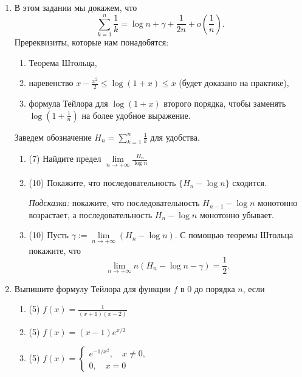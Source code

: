 \documentclass[a4paper]{article}
\begin{document}
\renewcommand{\labelenumii}{\arabic{enumii})}
\renewcommand{\labelenumiii}{\roman{enumiii})}




\begin{enumerate}
    
    \item В этом задании мы докажем, что 
    \[
        \sum\limits_{k = 1}^n \frac{1}{k} = \log n + \gamma + \frac{1}{2n} + o\left( \frac{1}{n} \right).
    \]
    Пререквизиты, которые нам понадобятся:
    \begin{enumerate}[label=(\arabic*)]
        \item Теорема Штольца,
        \item наревенство $x-\frac{x^2}{2}\leq \log (1+x)\leq x$ (будет доказано на практике),
        \item формула Тейлора для $\log(1+x)$ второго порядка, чтобы заменять $\log\left(1 + \frac{1}{n}\right)$ на более удобное выражение.
    \end{enumerate}
    Заведем обозначение $H_n = \sum\limits_{k = 1}^n \frac{1}{k}$ для удобства.
    \begin{enumerate}
        \item (7) Найдите предел $\lim\limits_{n\to +\infty}\frac{H_n}{\log n}$
        \item (10) Покажите, что последовательность $\{H_n - \log n\}$ сходится.
        
        \noindent\emph{Подсказка:} покажите, что последовательность $H_{n-1} - \log n$ монотонно возрастает, а последовательность $H_n - \log n$ монотонно убывает.
        
        \item (10) Пусть $\gamma:= \lim\limits_{n\to +\infty} (H_n - \log n)$. С помощью теоремы Штольца покажите, что
        \[
            \lim\limits_{n\to +\infty}n(H_n - \log n - \gamma) = \frac{1}{2}.
        \]
    \end{enumerate}
    
    \item Выпишите формулу Тейлора для функции $f$ в $0$ до порядка $n$, если
    \begin{enumerate}
        \item (5) $f(x) = \frac{1}{(x+1)(x-2)}$
        \item (5) $f(x) = (x-1)e^{x/2}$
        \item (5) $f(x) = \begin{cases}e^{-1/x^2},\quad x\neq 0,\\ 0,\quad x=0\end{cases}$
    \end{enumerate}
    

\end{enumerate}
\end{document}
